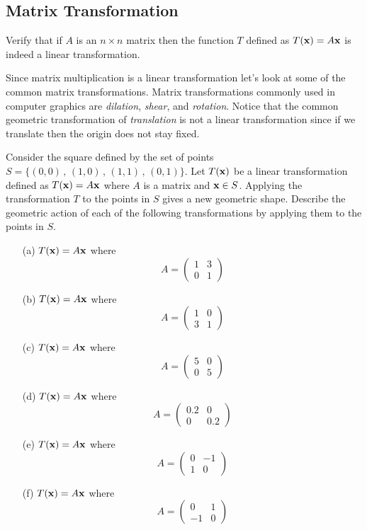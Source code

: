 \subsection{Matrix Transformation}
\begin{problem}
    Verify that if $A$ is an $n \times n$ matrix then the function $T$ defined as $T({\bf x}) =
    A{\bf x}$ is indeed a linear transformation.
\end{problem}

Since matrix multiplication is a linear transformation let's look at some of the common
matrix transformations.  Matrix transformations commonly used in computer graphics are
{\it dilation}, {\it shear}, and {\it rotation}.  Notice that the common geometric transformation of
{\it translation} is not a linear transformation since if we translate then the origin does not
stay fixed.
\begin{problem}
    Consider the square defined by the set of points $S =
    \{(0,0)\,,\,(1,0)\,,\,(1,1)\,,\,(0,1)\}$. Let $T({\bf x})$ be a linear transformation
    defined as $T({\bf x}) = A{\bf x}$ where $A$ is a matrix and ${\bf x} \in S$.  Applying the
    transformation $T$ to the points in $S$ gives a new geometric shape.  Describe the
    geometric action of each of the following transformations by applying them to the
    points in $S$.
    \begin{enumerate}
        \item[(a)] $T({\bf x}) = A{\bf x}$ where
            \[ A = \begin{pmatrix} 1 & 3 \\ 0 & 1 \end{pmatrix} \]
        \item[(b)] $T({\bf x}) = A{\bf x}$ where
            \[ A = \begin{pmatrix} 1 & 0 \\ 3 & 1 \end{pmatrix} \]
        \item[(c)] $T({\bf x}) = A{\bf x}$ where
            \[ A = \begin{pmatrix} 5 & 0 \\ 0 & 5 \end{pmatrix} \]
        \item[(d)] $T({\bf x}) = A{\bf x}$ where
            \[ A = \begin{pmatrix} 0.2 & 0 \\ 0 & 0.2 \end{pmatrix} \]
        \item[(e)] $T({\bf x}) = A{\bf x}$ where
            \[ A = \begin{pmatrix} 0 & -1 \\ 1 & 0 \end{pmatrix} \]
        \item[(f)] $T({\bf x}) = A{\bf x}$ where
            \[ A = \begin{pmatrix} 0 & 1 \\ -1 & 0 \end{pmatrix} \]
    \end{enumerate}
\end{problem}

